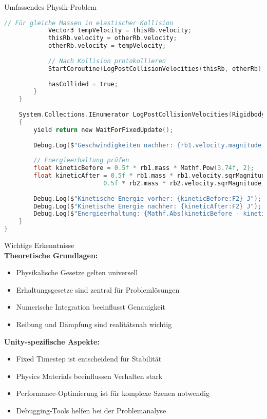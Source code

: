 \begin{example2}{Umfassendes Physik-Problem}
\begin{lstlisting}[language=C, style=basesmol]
            // Für gleiche Massen in elastischer Kollision
            Vector3 tempVelocity = thisRb.velocity;
            thisRb.velocity = otherRb.velocity;
            otherRb.velocity = tempVelocity;
            
            // Nach Kollision protokollieren
            StartCoroutine(LogPostCollisionVelocities(thisRb, otherRb));
            
            hasCollided = true;
        }
    }
    
    System.Collections.IEnumerator LogPostCollisionVelocities(Rigidbody rb1, Rigidbody rb2) 
    {
        yield return new WaitForFixedUpdate();
        
        Debug.Log($"Geschwindigkeiten nachher: {rb1.velocity.magnitude:F2}, {rb2.velocity.magnitude:F2}");
        
        // Energieerhaltung prüfen
        float kineticBefore = 0.5f * rb1.mass * Mathf.Pow(3.74f, 2);
        float kineticAfter = 0.5f * rb1.mass * rb1.velocity.sqrMagnitude + 
                           0.5f * rb2.mass * rb2.velocity.sqrMagnitude;
        
        Debug.Log($"Kinetische Energie vorher: {kineticBefore:F2} J");
        Debug.Log($"Kinetische Energie nachher: {kineticAfter:F2} J");
        Debug.Log($"Energieerhaltung: {Mathf.Abs(kineticBefore - kineticAfter) < 0.1f}");
    }
}
\end{lstlisting}
\end{example2}

\begin{concept}{Wichtige Erkenntnisse}\\
    \textbf{Theoretische Grundlagen:}
    \begin{itemize}
        \item Physikalische Gesetze gelten universell
        \item Erhaltungsgesetze sind zentral für Problemlösungen
        \item Numerische Integration beeinflusst Genauigkeit
        \item Reibung und Dämpfung sind realitätsnah wichtig
    \end{itemize}
    
    \textbf{Unity-spezifische Aspekte:}
    \begin{itemize}
        \item Fixed Timestep ist entscheidend für Stabilität
        \item Physics Materials beeinflussen Verhalten stark
        \item Performance-Optimierung ist für komplexe Szenen notwendig
        \item Debugging-Tools helfen bei der Problemanalyse
    \end{itemize}
\end{concept}